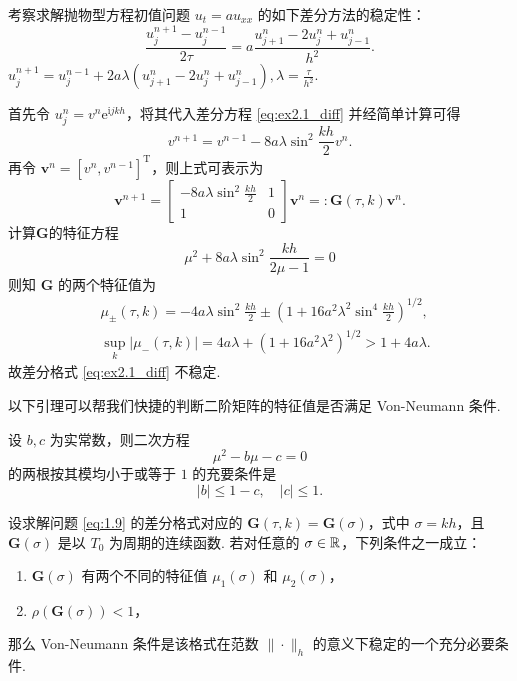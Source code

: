 \begin{instance}
    考察求解抛物型方程初值问题 $u_t = a u_{xx}$ 的如下差分方法的稳定性：
    \begin{equation}
        \frac{u_j^{n+1} - u_j^{n-1}}{2\tau} = a\frac{u_{j+1}^n - 2u_j^n + u_{j-1}^n}{h^2}. \label{eq:ex2.1_diff}
    \end{equation}
    \noindent{}\;\;$u_j^{n+1}=u_{j}^{n-1}+2a\lambda\left(u_{j+1}^n-2u_j^n+u_{j-1}^n\right),\lambda=\frac{\tau}{h^2}$.\par
    \noindent{} 首先令 $u_j^n = v^n\mathrm{e}^{\mathrm{i} j k h}$，将其代入差分方程 \eqref{eq:ex2.1_diff} 并经简单计算可得
    \[ v^{n+1} = v^{n-1} - 8a\lambda \sin^2\frac{kh}{2} v^n. \]
    再令 $\bm{v}^n = [v^n, v^{n-1}]^{\mathrm{T}}$，则上式可表示为
    \[ \bm{v}^{n+1} = \begin{bmatrix} -8a\lambda\sin^2\frac{kh}{2} & 1 \\ 1 & 0 \end{bmatrix} \bm{v}^n =: \bm{G}(\tau,k)\bm{v}^n. \]
    \noindent{} 计算$\bm{G}$的特征方程
    \[\mu^2+8a\lambda\sin^2\frac{kh}{2\mu-1}=0\]
    则知 $\bm{G}$ 的两个特征值为
    \begin{align*}
        & \mu_{\pm}(\tau,k) = -4a\lambda\sin^2\frac{kh}{2} \pm \left( 1 + 16a^2\lambda^2\sin^4\frac{kh}{2} \right)^{1/2}, \\
        & \sup_k |\mu_{-}(\tau,k)| = 4a\lambda + (1+16a^2\lambda^2)^{1/2} > 1 + 4a\lambda.
    \end{align*}
    故差分格式 \eqref{eq:ex2.1_diff} 不稳定.
\end{instance}

以下引理可以帮我们快捷的判断二阶矩阵的特征值是否满足 Von-Neumann 条件.
\begin{lemma}
    设 $b, c$ 为实常数，则二次方程
    \begin{equation}
        \mu^2 - b\mu - c = 0 \label{eq:lem3.1_1}
    \end{equation}
    的两根按其模均小于或等于 $1$ 的充要条件是
    \begin{equation}
        |b| \leq 1 - c, \quad |c| \leq 1. \label{eq:lem3.1_2}
    \end{equation}
\end{lemma}

\begin{theorem}\label{thm:3.2}
    设求解问题 \eqref{eq:1.9} 的差分格式对应的 $\bm{G}(\tau, k) = \bm{G}(\sigma)$，式中 $\sigma = kh$，且 $\bm{G}(\sigma)$ 是以 $T_0$ 为周期的连续函数. 若对任意的 $\sigma \in \mathbb{R}$，下列条件之一成立：
    \begin{enumerate}[(1)]
        \item $\bm{G}(\sigma)$ 有两个不同的特征值 $\mu_1(\sigma)$ 和 $\mu_2(\sigma)$，
        \item $\rho(\bm{G}(\sigma)) < 1$，
    \end{enumerate}
    那么 Von-Neumann 条件是该格式在范数 $\|\cdot\|_h$ 的意义下稳定的一个充分必要条件.
\end{theorem}

